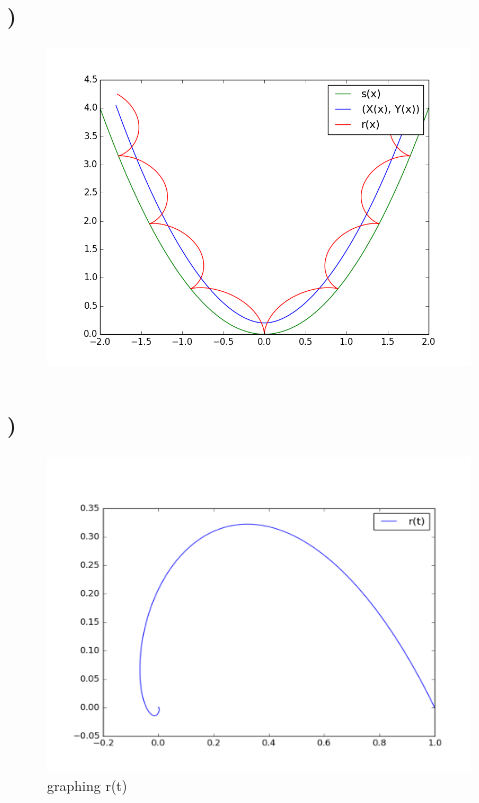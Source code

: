 \documentclass[a4paper,10pt,norsk]{article}
\begin{document}
\subsection{)}



\begin{figure}[h!]
        \centering 
        \includegraphics[scale=0.6]{oppg_f.png}
\end{figure}

\pagebreak

\section{}
\subsection{)}

\begin{figure}[h!]
        \centering 
        \includegraphics[scale=0.5]{skisse.png} 
        \caption{graphing r(t)}
\end{figure}
\end{document}
